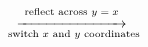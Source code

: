 \documentclass[12pt]{ximera}
\begin{document}
\[ \begin{array}{ccc}



&

\stackrel{\stackrel{\mbox{\scriptsize reflect across $y=x$}}{\xrightarrow{\hspace{1in}}}}{\mbox{ \scriptsize switch $x$ and $y$ coordinates}} 

&



\end{array}\] 

\end{document}
